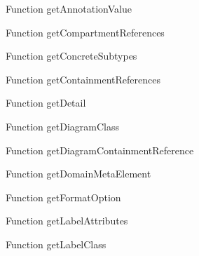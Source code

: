\begin{minipage}[b]{0.5\textwidth}
\centering
{}
Function getAnnotationValue
\end{minipage}
\begin{minipage}[b]{0.5\textwidth}
\centering
{}
Function getCompartmentReferences
\end{minipage}
\begin{minipage}[b]{0.5\textwidth}
\centering
{}
Function getConcreteSubtypes
\end{minipage}
\begin{minipage}[b]{0.5\textwidth}
\centering
{}
Function getContainmentReferences
\end{minipage}
\begin{minipage}[b]{0.5\textwidth}
\centering
{}
Function getDetail
\end{minipage}
\begin{minipage}[b]{0.5\textwidth}
\centering
{}
Function getDiagramClass
\end{minipage}
\begin{minipage}[b]{0.5\textwidth}
\centering
{}
Function getDiagramContainmentReference
\end{minipage}
\begin{minipage}[b]{0.5\textwidth}
\centering
{}
Function getDomainMetaElement
\end{minipage}
\begin{minipage}[b]{0.5\textwidth}
\centering
{}
Function getFormatOption
\end{minipage}
\begin{minipage}[b]{0.5\textwidth}
\centering
{}
Function getLabelAttributes
\end{minipage}
\begin{minipage}[b]{0.5\textwidth}
\centering
{}
Function getLabelClass
\end{minipage}

